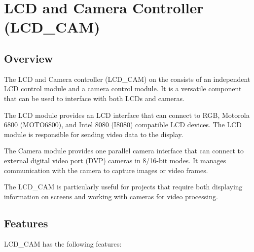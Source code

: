 \documentclass[main\_\_EN.tex]{subfiles}
\begin{document}
\setenglishformatting


\ifglobal
\else
    \clearpage
    \listoftodos
    \listofdonetodos
    \tableofcontents
\fi


\hypertarget{camlcdctrl}{}
\chapter{LCD and Camera Controller (LCD\_CAM)}
\label{mod:camlcdctrl}

\section{Overview}

The LCD and Camera controller (LCD\_CAM) on the \chipname{} consists of an independent LCD control module and a camera control module. It is a versatile component that can be used to interface with both LCDs and cameras.

The LCD module provides an LCD interface that can connect to RGB, Motorola 6800 (MOTO6800), and Intel 8080 (I8080) compatible LCD devices. The LCD module is responsible for sending video data to the display.

The Camera module provides one parallel camera interface that can connect to external digital video port (DVP) cameras in 8/16-bit modes. It manages communication with the camera to capture images or video frames.

The LCD\_CAM is particularly useful for projects that require both displaying information on screens and working with cameras for video processing.

\section{Features}

LCD\_CAM has the following features:
\end{document}
